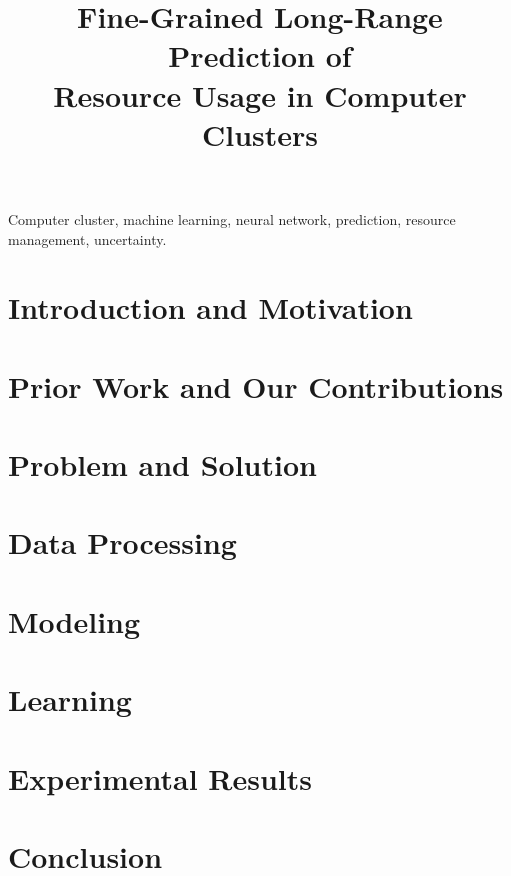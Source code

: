 \documentclass[journal]{IEEEtran}
\title{
  Fine-Grained Long-Range Prediction of\\
  Resource Usage in Computer Clusters
}
\author{}
\begin{document}
  \maketitle

  \begin{abstract}
    
  \end{abstract}

  \begin{IEEEkeywords}
    Computer cluster,
    machine learning,
    neural network,
    prediction,
    resource management,
    uncertainty.
  \end{IEEEkeywords}


  \section{Introduction and Motivation} 
  

  
  
  \section{Prior Work and Our Contributions} 
  

  \section{Problem and Solution} 
  

  \section{Data Processing} 
  

  \section{Modeling} 
  

  \section{Learning} 
  

  \balance

  \section{Experimental Results} 
  

  \section{Conclusion} 
  
  

  
  
\end{document}

